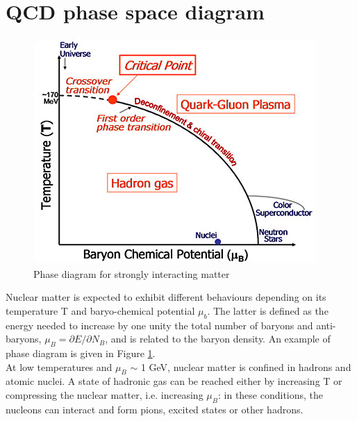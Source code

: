 \section{QCD phase space diagram}
%
\begin{figure}
  \centering
  \includegraphics[scale=0.5]{figures/phase.jpg}
  \caption{Phase diagram for strongly interacting matter}
  \label{fig:phase}
\end{figure}
%
Nuclear matter is expected to exhibit different behaviours depending on its temperature T and baryo-chemical potential $\mu_{b}$. The latter is defined
as the energy needed to increase by one unity the total number of baryons and anti-baryons, $\mu_{B}= \partial E / \partial N_{B}$, and is related to the baryon density. An example of phase diagram is given in Figure \ref{fig:phase}.\\ At low temperatures and $\mu_{B}$ $\sim$ 1 GeV, nuclear matter is confined in hadrons and atomic nuclei. A state of hadronic gas can be reached either by increasing T or compressing the nuclear matter, i.e. increasing $\mu_{B}$: in these conditions, the nucleons can interact and form pions, excited states or other hadrons.
